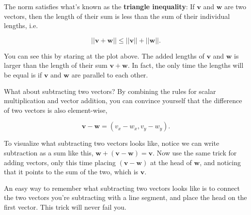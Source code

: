 \documentclass[
  letterpaper,
  DIV=11,
  numbers=noendperiod]{scrreprt}
\begin{document}
The norm satisfies what's known as the \textbf{triangle inequality}: If
\(\mathbf{v}\) and \(\mathbf{w}\) are two vectors, then the length of
their sum is less than the sum of their individual lengths, i.e.

\[||\mathbf{v}+\mathbf{w}|| \leq ||\mathbf{v}|| + ||\mathbf{w}||.\]

You can see this by staring at the plot above. The added lengths of
\(\mathbf{v}\) and \(\mathbf{w}\) is larger than the length of their sum
\(\mathbf{v}+\mathbf{w}\). In fact, the only time the lengths will be
equal is if \(\mathbf{v}\) and \(\mathbf{w}\) are parallel to each
other.

What about subtracting two vectors? By combining the rules for scalar
multiplication and vector addition, you can convince yourself that the
difference of two vectors is also element-wise,

\[\mathbf{v}-\mathbf{w} = (v_x-w_x,v_y-w_y).\]

To visualize what subtracting two vectors looks like, notice we can
write subtraction as a sum like this,
\(\mathbf{w} + (\mathbf{v}-\mathbf{w}) = \mathbf{v}\). Now use the same
trick for adding vectors, only this time placing
\((\mathbf{v}-\mathbf{w})\) at the head of \(\mathbf{w}\), and noticing
that it points to the sum of the two, which is \(\mathbf{v}\).

An easy way to remember what subtracting two vectors looks like is to
connect the two vectors you're subtracting with a line segment, and
place the head on the first vector. This trick will never fail you.
\end{document}
